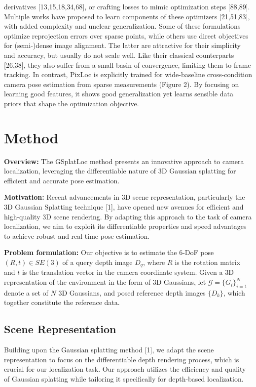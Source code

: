 \documentclass[twocolumn]{article} %
\begin{document}
derivatives {[}13,15,18,34,68{]}, or crafting losses to mimic
optimization steps {[}88,89{]}. Multiple works have proposed to learn
components of these optimizers {[}21,51,83{]}, with added complexity and
unclear generalization. Some of these formulations optimize reprojection
errors over sparse points, while others use direct objectives for
(semi-)dense image alignment. The latter are attractive for their
simplicity and accuracy, but usually do not scale well. Like their
classical counterparts {[}26,38{]}, they also suffer from a small basin
of convergence, limiting them to frame tracking. In contrast, PixLoc is
explicitly trained for wide-baseline cross-condition camera pose
estimation from sparse measurements (Figure 2). By focusing on learning
good features, it shows good generalization yet learns sensible data
priors that shape the optimization objective.

\section{Method}\label{method}

\textbf{Overview:} The GSplatLoc method presents an innovative approach
to camera localization, leveraging the differentiable nature of 3D
Gaussian splatting for efficient and accurate pose estimation.

\textbf{Motivation:} Recent advancements in 3D scene representation,
particularly the 3D Gaussian Splatting technique {[}1{]}, have opened
new avenues for efficient and high-quality 3D scene rendering. By
adapting this approach to the task of camera localization, we aim to
exploit its differentiable properties and speed advantages to achieve
robust and real-time pose estimation.

\textbf{Problem formulation:} Our objective is to estimate the 6-DoF
pose \((R, t) \in SE(3)\) of a query depth image \(D_q\), where \(R\) is
the rotation matrix and \(t\) is the translation vector in the camera
coordinate system. Given a 3D representation of the environment in the
form of 3D Gaussians, let \(\mathcal{G} = \{G_i\}_{i=1}^N\) denote a set
of \(N\) 3D Gaussians, and posed reference depth images \(\{D_k\}\),
which together constitute the reference data.

\subsection{Scene Representation}\label{scene-representation}

Building upon the Gaussian splatting method {[}1{]}, we adapt the scene
representation to focus on the differentiable depth rendering process,
which is crucial for our localization task. Our approach utilizes the
efficiency and quality of Gaussian splatting while tailoring it
specifically for depth-based localization.
\end{document}
